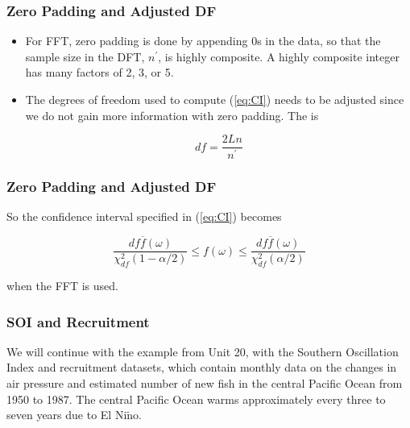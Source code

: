 \documentclass[%
xcolor=pdftex]{beamer}
\begin{document}
\begin{frame} 
\frametitle{Zero Padding and Adjusted DF}


\begin{itemize}

\item For FFT, zero padding is done by appending 0s in the data, so that the sample size in the DFT, $n^\prime$, is highly composite. A highly composite integer has many factors of 2, 3, or 5. 

\item The degrees of freedom used to compute (\ref{eq:CI}) needs to be adjusted since we do not gain more information with zero padding. The \underline{\hspace{50 mm}} is 

\begin{equation}
df = \frac{2Ln}{n^\prime}
\end{equation}

\end{itemize}

\end{frame}

\begin{frame} 
\frametitle{Zero Padding and Adjusted DF}


So the confidence interval specified in (\ref{eq:CI}) becomes

\begin{equation} \label{eq:CI0}
\frac{df  \overline{f}(\omega)}{{\chi_{df}^2(1-\alpha/2)}} \leq f(\omega) \leq \frac{df  \overline{f}(\omega)}{{\chi_{df}^2(\alpha/2)}}
\end{equation}

when the FFT is used.


\end{frame}


\begin{frame}
\frametitle{SOI and Recruitment}

We will continue with the example from Unit 20, with the Southern Oscillation Index and recruitment datasets, which contain monthly data on the changes in air pressure and estimated number of new fish in the central Pacific Ocean from 1950 to 1987. The central Pacific Ocean warms approximately every three to seven years due to El Ni$\tilde{\text{n}}$o.

\end{frame}
\end{document}
